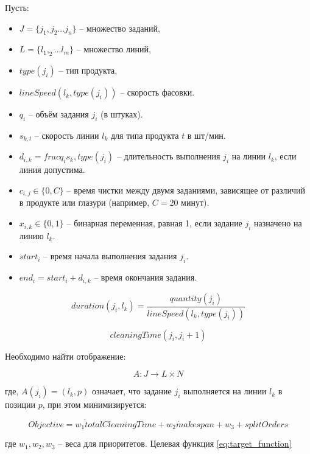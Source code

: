 Пусть:
\begin{itemize}
    \item $J =\{j_1, j_2...j_n\}$ -- множество заданий,
    \item $ L = \{l_1, _2...l_m\}$ -- множество линий,
    \item $type(j_i)$ -- тип продукта,
    \item $lineSpeed(l_k,type(j_i))$ -- скорость фасовки.
    \item $q_i$ -- объём задания $j_i$ (в штуках).
    \item $s_{k,t}$ -- скорость линии $l_k$ для типа продукта $t$ в шт/мин.
    \item $d_{i,k} = frac{q_i}{s_k, type(j_i)}$ -- длительность выполнения $j_i$ на линии $l_k$, если линия допустима.
    \item $c_{i,j} \in \{0, C\}$ -- время чистки между двумя заданиями, зависящее от различий в продукте или глазури (например, $C = 20$ минут).
    \item $x_{i,k} \in \{0, 1\}$ -- бинарная переменная, равная 1, если задание $j_i$ назначено на линию $l_k$.
    \item $start_i$ -- время начала выполнения задания $j_i$.
    \item $end_i = start_i+ d_{i,k}$ -- время окончания задания.
\end{itemize}

\begin{equation}
    duration(j_i, l_k) = \frac{quantity(j_i)}{lineSpeed(l_k,type(j_i))}
\end{equation}

\begin{equation}
    cleaningTime(j_i, j_i + 1)
    \label{eq:cleaning_time}
\end{equation}

\noindent Необходимо найти отображение:

\begin{equation}
    A : J \rightarrow L \times N
    \label{eq:find}
\end{equation}

\noindent где, $A(j_i) = (l_k,p)$ означает, что задание $j_i$ выполняется на линии $l_k$  в позиции $p$, при этом минимизируется:

\begin{equation}
    Objective = w_1 \dot totalCleaningTime + w_2 \dot makespan + w_3 + splitOrders
\end{equation}

\noindent где $w_1, w_2, w_3$ -- веса для приоритетов. Целевая функция \eqref{eq:target_function}

